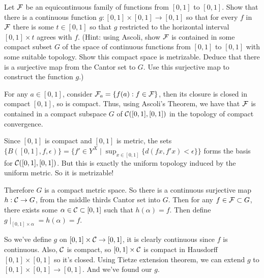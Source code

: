 \documentclass[a4paper, 10pt]{article}
\begin{document}
\begin{problem} [\done]
    Let $\mathcal{F}$ be an equicontinuous family of functions from $[0, 1]$ to $[0, 1]$. Show that there is a continuous function $g: [0, 1] \times [0, 1] \to [0, 1]$ so that for every $f$ in $\mathcal{F}$ there is some $t \in [0, 1]$ so that $g$ restricted to the horizontal interval $[0, 1] \times t$ agrees with $f$. (Hint: using Ascoli, show $\mathcal{F}$ is contained in some compact subset $G$ of the space of continuous functions from $[0, 1]$ to $[0, 1]$ with some suitable topology. Show this compact space is metrizable. Deduce that there is a surjective map from the Cantor set to $G$. Use this surjective map to construct the function $g$.)
\end{problem}
\begin{solution}
    For any $a \in [0, 1]$, consider $\mathcal{F}_a = \{f(a) : f \in \mathcal{F}\}$, then its closure is closed in compact $[0, 1]$, so is compact. Thus, using Ascoli's Theorem, we have that $\mathcal{F}$ is contained in a compact subspace $G$ of $\mathcal{C}([0, 1], [0, 1])$ in the topology of compact convergence.

    Since $[0, 1]$ is compact and $[0, 1]$ is metric, the sets $\{B([0, 1], f, \epsilon)\} = \{f' \in Y^X \mid \sup_{x \in [0, 1]} \{d(fx, f'x) < \epsilon\}\}$ forms the basis for $\mathcal{C}{([0, 1], [0, 1])}$. But this is exactly the uniform topology induced by the uniform metric. So it is metrizable!

    Therefore $G$ is a compact metric space. So there is a continuous surjective map $h: \mathcal{C} \to G$, from the middle thirds Cantor set into $G$. Then for any $f \in \mathcal{F} \subset G$, there exists some $\alpha \in \mathcal{C} \subset [0, 1]$ such that $h(\alpha) = f$. Then define $g\mid_{[0, 1] \times \alpha} = h(\alpha) = f$.

    So we've define $g$ on $[0, 1] \times \mathcal{C} \to [0, 1]$, it is clearly continuous since $f$ is continuous. Also, $\mathcal{C}$ is compact, so $[0, 1] \times \mathcal{C}$ is compact in Hausdorff $[0, 1] \times [0, 1]$ so it's closed. Using Tietze extension theorem, we can extend $g$ to $[0, 1] \times [0, 1] \to [0, 1]$. And we've found our $g$. 
\end{solution}
\end{document}
